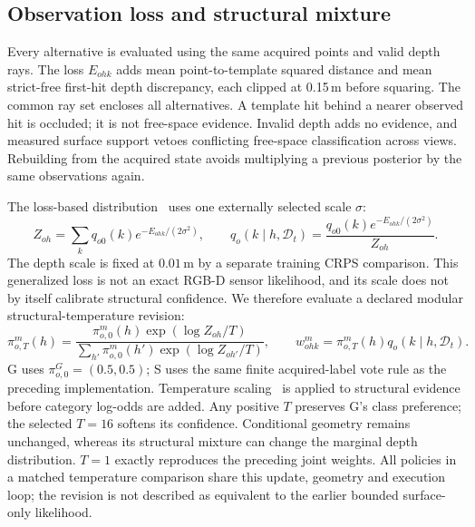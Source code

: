 \subsection{Observation loss and structural mixture}
Every alternative is evaluated using the same acquired points and valid depth rays. The loss $E_{ohk}$ adds mean point-to-template squared distance and mean strict-free first-hit depth discrepancy, each clipped at 0.15\,m before squaring. The common ray set encloses all alternatives. A template hit behind a nearer observed hit is occluded; it is not free-space evidence. Invalid depth adds no evidence, and measured surface support vetoes conflicting free-space classification across views. Rebuilding from the acquired state avoids multiplying a previous posterior by the same observations again.

The loss-based distribution~\cite{bissiri2016} uses one externally selected scale $\sigma$:
\begin{equation}
Z_{oh}=\sum_k q_{o0}(k)e^{-E_{ohk}/(2\sigma^2)},\qquad
q_o(k\mid h,\mathcal D_t)=\frac{q_{o0}(k)e^{-E_{ohk}/(2\sigma^2)}}{Z_{oh}}.
\end{equation}
The depth scale is fixed at $0.01$\,m by a separate training CRPS comparison. This generalized loss is not an exact RGB-D sensor likelihood, and its scale does not by itself calibrate structural confidence. We therefore evaluate a declared modular structural-temperature revision:
\begin{equation}
\pi_{o,T}^m(h)=
\frac{\pi_{o,0}^m(h)\exp(\log Z_{oh}/T)}
{\sum_{h'}\pi_{o,0}^m(h')\exp(\log Z_{oh'}/T)},\qquad
w_{ohk}^m=\pi_{o,T}^m(h)q_o(k\mid h,\mathcal D_t).
\label{eq:modular-update}
\end{equation}
G uses $\pi_{o,0}^G=(0.5,0.5)$; S uses the same finite acquired-label vote rule as the preceding implementation. Temperature scaling~\cite{pmlr-v70-guo17a} is applied to structural evidence before category log-odds are added. Any positive $T$ preserves G's class preference; the selected $T=16$ softens its confidence. Conditional geometry remains unchanged, whereas its structural mixture can change the marginal depth distribution. $T=1$ exactly reproduces the preceding joint weights. All policies in a matched temperature comparison share this update, geometry and execution loop; the revision is not described as equivalent to the earlier bounded surface-only likelihood.

